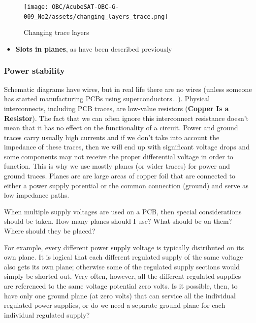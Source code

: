 \documentclass[final]{cubedoc}
\begin{document}
	\begin{figure}[h!]
		\centering
		\texttt{[image: OBC/AcubeSAT-OBC-G-009\_No2/assets/changing\_layers\_trace.png]}
		\caption{Changing trace layers}
		\label{fig:my_label}
	\end{figure}
	
	\begin{itemize}
		\item \textbf{Slots in planes}, as have been described previously
		
	\end{itemize}
	
	\subsubsection{Power stability}
	\label{subsubsec:plane}
	
	Schematic diagrams have wires, but in real life there are no wires (unless someone has started manufacturing PCBs using superconductors...). Physical interconnects, including PCB traces, are low-value resistors (\textbf{Copper Is a Resistor}). The fact that we can often ignore this interconnect resistance doesn’t mean that it has no effect on the functionality of a circuit. Power and ground traces carry usually high currents and if we don’t take into account the impedance of these traces, then we will end up with significant voltage drops and some components may not receive the proper differential voltage in order to function. This is why we use mostly planes (or wider traces) for power and ground traces. Planes are  are large areas of copper foil that are connected to either a power supply potential or the common connection (ground)  and serve as low impedance paths.
	
	When multiple supply voltages are used on a PCB, then special considerations should be taken. How many planes should
	I use? What should be on them? Where should they be placed?
	
	For example, every different power supply voltage is typically distributed on its own plane. It is logical that each different regulated supply of the same voltage also gets its own plane; otherwise some of the regulated supply sections would simply be shorted out. Very often, however, all the different regulated supplies are referenced to the same voltage potential​ zero volts. Is it possible, then, to have only one ground plane (at zero volts) that can service all the individual regulated power supplies, or do we need a separate ground plane for each individual regulated supply?
	
\end{document}
